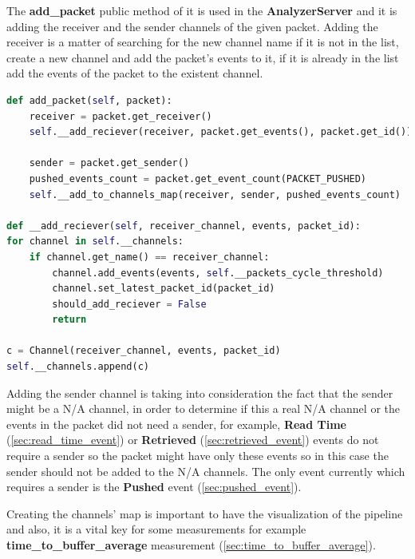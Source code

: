 The \textbf{add\_packet} public method of it is used in the \textbf{AnalyzerServer}
and it is adding the receiver and the sender channels of the given packet. Adding the receiver is 
a matter of searching for the new channel name if it is not in the list, create a new channel
and add the packet's events to it, if it is already in the list add the events of 
the packet to the existent channel.
\newline
\begin{lstlisting}[language=python, label=code:add_packet, caption={add receiving channel},captionpos=b]
def add_packet(self, packet):
	receiver = packet.get_receiver()
	self.__add_reciever(receiver, packet.get_events(), packet.get_id())

	sender = packet.get_sender()
	pushed_events_count = packet.get_event_count(PACKET_PUSHED)
	self.__add_to_channels_map(receiver, sender, pushed_events_count)

def __add_reciever(self, receiver_channel, events, packet_id):
for channel in self.__channels:
	if channel.get_name() == receiver_channel:
		channel.add_events(events, self.__packets_cycle_threshold)
		channel.set_latest_packet_id(packet_id)
		should_add_reciever = False
		return

c = Channel(receiver_channel, events, packet_id)
self.__channels.append(c)
\end{lstlisting}

Adding the sender channel is taking into consideration the fact that the sender might be a N/A channel,
in order to determine if this a real N/A channel or the events in the packet did not need a sender, for 
example, \textbf{Read Time} (\ref{sec:read_time_event}) or \textbf{Retrieved} (\ref{sec:retrieved_event}) 
events do not require a sender so the packet
might have only these events so in this case the sender should not be added to the N/A channels.
The only event currently which requires a sender is the \textbf{Pushed} event (\ref{sec:pushed_event}).

Creating the channels' map is important to have the visualization of the pipeline and also, it is a vital
key for some measurements for example \textbf{time\_to\_buffer\_average} measurement (\ref{sec:time_to_buffer_average}).

